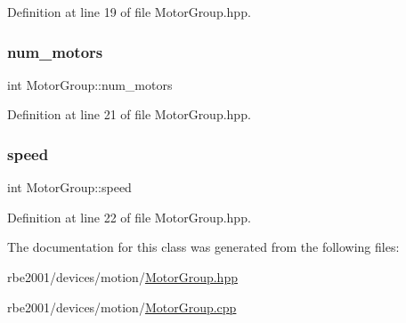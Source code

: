 Definition at line 19 of file Motor\+Group.\+hpp.

\mbox{\label{class_motor_group_a93ffa3ad9fc210e6d2ed29b50dbf7292}} 
\subsubsection{\texorpdfstring{num\+\_\+motors}{num\_motors}}
{\footnotesize\ttfamily int Motor\+Group\+::num\+\_\+motors\hspace{0.3cm}{\ttfamily [private]}}



Definition at line 21 of file Motor\+Group.\+hpp.

\mbox{\label{class_motor_group_a79ddfc90443f2f919d88f66e51494d97}} 
\subsubsection{\texorpdfstring{speed}{speed}}
{\footnotesize\ttfamily int Motor\+Group\+::speed\hspace{0.3cm}{\ttfamily [private]}}



Definition at line 22 of file Motor\+Group.\+hpp.



The documentation for this class was generated from the following files\+:\begin{DoxyCompactItemize}
\item 
rbe2001/devices/motion/\hyperlink{_motor_group_8hpp}{Motor\+Group.\+hpp}\item 
rbe2001/devices/motion/\hyperlink{_motor_group_8cpp}{Motor\+Group.\+cpp}\end{DoxyCompactItemize}
